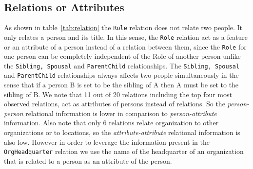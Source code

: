 \documentclass[paper=a4,fontsize=11pt]{scrartcl}
\newcommand{\tabref}[1]{table~\ref{#1}}
\numberwithin{equation}{section}    %
\numberwithin{figure}{section}      %
\numberwithin{table}{section}       %
\begin{document}
\subsection{Relations or Attributes}
\label{sec:relat-or-attr}
As shown in \tabref{tab:relation} the \texttt{Role} relation does not relate two people.
It only relates a person and its title.
In this sense, the \texttt{Role} relation act as a feature or an attribute of a person
instead of a relation between them, since the \texttt{Role} for one person can be completely
independent of the Role of another person unlike the \texttt{Sibling, Spousal} and \texttt{ParentChild}
relationships. The \texttt{Sibling, Spousal} and \texttt{ParentChild} relationships always affects two
people simultaneously in the sense that if a person \textsc{B} is set to be the sibling of \textsc{A} then
\textsc{A} must be set to the sibling of \textsc{B}.
We note that 11 out of 20 relations including the top four most observed relations,
act as attributes of persons instead of relations. So the \textit{person-person} relational
information is lower in comparison to \textit{person-attribute} information.
Also note that only 6 relations relate organization to other organizations or
to locations, so the \textit{attribute-attribute} relational information is
also low. However in order to leverage the information present in the
\texttt{OrgHeadquarter} relation we use the name of the headquarter of an
organization that is related to a person as an attribute of the person.
\end{document}

